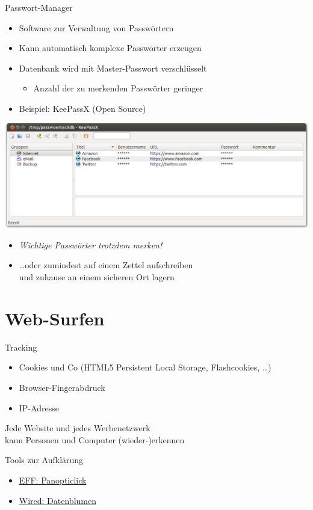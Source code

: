   \begin{frame}{Passwort-Manager}
    \begin{itemize}
      \item Software zur Verwaltung von Passwörtern
      \item Kann automatisch komplexe Passwörter erzeugen
      \item Datenbank wird mit Master-Passwort verschlüsselt
      \begin{itemize}
        \item Anzahl der zu merkenden Passwörter geringer
      \end{itemize}
      \item Beispiel: KeePassX (Open Source)
    \end{itemize}
      \includegraphics[width=\textwidth]{images/keepassx.png}
    \begin{itemize}
      \item \emph{Wichtige Passwörter trotzdem merken!}
      \item \ldots oder zumindest auf einem Zettel aufschreiben\\ und zuhause an einem sicheren Ort lagern
    \end{itemize}
  \end{frame}

\section{Web-Surfen}
  \begin{frame}{Tracking}
    \begin{itemize}
      \item Cookies und Co (HTML5 Persistent Local Storage, Flashcookies, \ldots)
      \item Browser-Fingerabdruck
      \item IP-Adresse
    \end{itemize}
    Jede Website und jedes Werbenetzwerk\\kann Personen und Computer (wieder-)erkennen

    \begin{block}{Tools zur Aufklärung}
    \begin{itemize}
      \item \href{https://panopticlick.eff.org/}{EFF: Panopticlick}
      \item \href{http://datenblumen.wired.de/}{Wired: Datenblumen}
    \end{itemize}
    \end{block}
  \end{frame}

